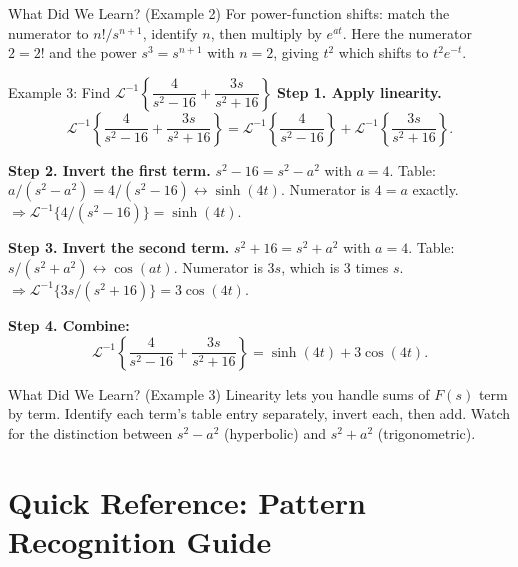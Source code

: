 \documentclass[12pt,a4paper]{article}
\begin{document}
\begin{learnbox}{What Did We Learn? (Example 2)}
For power-function shifts: match the numerator to $n!/s^{n+1}$, identify $n$, then multiply
by $e^{at}$. Here the numerator $2 = 2!$ and the power $s^3 = s^{n+1}$ with $n=2$, giving
$t^2$ which shifts to $t^2 e^{-t}$.
\end{learnbox}

\begin{infobox}{Example 3: Find $\mathcal{L}^{-1}\!\left\{\dfrac{4}{s^2-16} + \dfrac{3s}{s^2+16}\right\}$}
\textbf{Step 1. Apply linearity.}
\[
  \mathcal{L}^{-1}\!\left\{\frac{4}{s^2-16} + \frac{3s}{s^2+16}\right\}
  = \mathcal{L}^{-1}\!\left\{\frac{4}{s^2-16}\right\}
    + \mathcal{L}^{-1}\!\left\{\frac{3s}{s^2+16}\right\}.
\]

\textbf{Step 2. Invert the first term.}
$s^2 - 16 = s^2 - a^2$ with $a = 4$.
Table: $a/(s^2-a^2) = 4/(s^2-16) \leftrightarrow \sinh(4t)$.
Numerator is $4 = a$ exactly.
$\Rightarrow \mathcal{L}^{-1}\{4/(s^2-16)\} = \sinh(4t)$.

\textbf{Step 3. Invert the second term.}
$s^2 + 16 = s^2 + a^2$ with $a = 4$.
Table: $s/(s^2+a^2) \leftrightarrow \cos(at)$.
Numerator is $3s$, which is $3$ times $s$.
$\Rightarrow \mathcal{L}^{-1}\{3s/(s^2+16)\} = 3\cos(4t)$.

\textbf{Step 4. Combine:}
\[
  \mathcal{L}^{-1}\!\left\{\frac{4}{s^2-16} + \frac{3s}{s^2+16}\right\}
  = \sinh(4t) + 3\cos(4t).
\]
\end{infobox}

\begin{learnbox}{What Did We Learn? (Example 3)}
Linearity lets you handle sums of $F(s)$ term by term. Identify each term's table entry
separately, invert each, then add. Watch for the distinction between $s^2 - a^2$ (hyperbolic)
and $s^2 + a^2$ (trigonometric).
\end{learnbox}

\section{Quick Reference: Pattern Recognition Guide}
\end{document}
